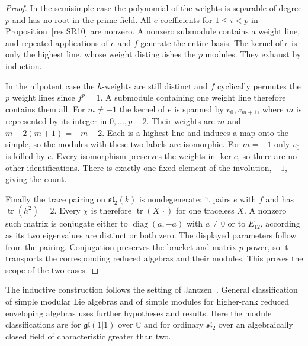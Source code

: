 \begin{proof}
In the semisimple case the polynomial of the weights is
separable of degree \(p\) and has no root in the prime field.
All \(e\)-coefficients for \(1\le i<p\) in
Proposition~\ref{res:SR10} are nonzero. A nonzero
submodule contains a weight line, and repeated applications
of \(e\) and \(f\) generate the entire basis. The kernel of
\(e\) is only the highest line, whose weight distinguishes
the \(p\) modules. They exhaust by induction.

In the nilpotent case the \(h\)-weights are still distinct
and \(f\) cyclically permutes the \(p\) weight lines since
\(f^p=1\). A submodule containing one weight line therefore
contains them all. For \(m\ne-1\) the kernel of \(e\) is
spanned by \(v_0,v_{m+1}\), where \(m\) is represented by
its integer in \(0,\ldots,p-2\). Their weights are \(m\)
and \(m-2(m+1)=-m-2\). Each is a highest line and induces
a map onto the simple, so the modules with these two labels
are isomorphic. For \(m=-1\) only \(v_0\) is killed by \(e\).
Every isomorphism preserves the weights in \(\ker e\), so
there are no other identifications. There is exactly one
fixed element of the involution, \(-1\), giving the count.

Finally the trace pairing on \(\mathfrak{sl}_2(k)\) is
nondegenerate: it pairs \(e\) with \(f\) and has
\(\operatorname{tr}(h^2)=2\). Every \(\chi\) is therefore
\(\operatorname{tr}(X\,\cdot)\) for one traceless \(X\).
A nonzero such matrix is conjugate either to
\(\operatorname{diag}(a,-a)\) with \(a\ne0\) or to
\(E_{12}\), according as its two eigenvalues are distinct
or both zero. The displayed parameters follow from the
pairing. Conjugation preserves the bracket and matrix
\(p\)-power, so it transports the corresponding reduced
algebras and their modules. This proves the scope of the
two cases.
\end{proof}

The inductive construction follows the setting of
Jantzen~\cite[Sections B.3--B.4, B.10 and C.3,
PDF pp.~6--7 and 9--11]{jantzen-modular}.
General classification of simple modular Lie algebras and of
simple modules for higher-rank reduced enveloping algebras
uses further hypotheses and results. Here the module
classifications are for \(\mathfrak{gl}(1|1)\) over
\(\mathbb C\) and for ordinary \(\mathfrak{sl}_2\) over an
algebraically closed field of characteristic greater than two.
